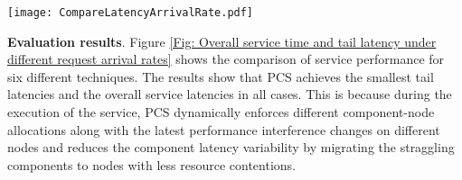 \documentclass[10pt, conference, compsocconf]{IEEEtran}
\begin{document}
\begin{figure*}
\centering
  \texttt{[image: CompareLatencyArrivalRate.pdf]}\\
  \caption{Comparison of overall service latency and the tail latency under different request arrival rates}
  \label{Fig: Overall service time and tail latency under different request arrival rates}
\end{figure*}

\textbf{Evaluation results}.
Figure \ref{Fig: Overall service time and tail latency under different request arrival rates} shows the comparison of service performance for six different techniques. The results show that PCS achieves the smallest tail latencies and the overall service latencies in all cases. This is because during the execution of the service, PCS dynamically enforces different component-node allocations along with the latest performance interference changes on different nodes and reduces the component latency variability by migrating the straggling components to nodes with less resource contentions.
\end{document}
